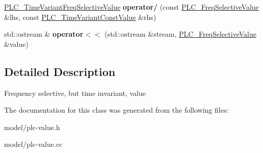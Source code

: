 \begin{DoxyCompactItemize}
\item 
\hypertarget{classns3_1_1PLC__FreqSelectiveValue_ac83aa895ecbeab5a39607bac5dfdd80a}{\hyperlink{classns3_1_1PLC__TimeVariantFreqSelectiveValue}{\-P\-L\-C\-\_\-\-Time\-Variant\-Freq\-Selective\-Value} {\bfseries operator/} (const \hyperlink{classns3_1_1PLC__FreqSelectiveValue}{\-P\-L\-C\-\_\-\-Freq\-Selective\-Value} \&lhs, const \hyperlink{classns3_1_1PLC__TimeVariantConstValue}{\-P\-L\-C\-\_\-\-Time\-Variant\-Const\-Value} \&rhs)}\label{classns3_1_1PLC__FreqSelectiveValue_ac83aa895ecbeab5a39607bac5dfdd80a}

\item 
\hypertarget{classns3_1_1PLC__FreqSelectiveValue_a64b2ca968a1db457f4c26f757c069d1d}{std\-::ostream \& {\bfseries operator$<$$<$} (std\-::ostream \&stream, \hyperlink{classns3_1_1PLC__FreqSelectiveValue}{\-P\-L\-C\-\_\-\-Freq\-Selective\-Value} \&value)}\label{classns3_1_1PLC__FreqSelectiveValue_a64b2ca968a1db457f4c26f757c069d1d}

\end{DoxyCompactItemize}


\subsection{\-Detailed \-Description}
\-Frequency selective, but time invariant, value 

\-The documentation for this class was generated from the following files\-:\begin{DoxyCompactItemize}
\item 
model/plc-\/value.\-h\item 
model/plc-\/value.\-cc\end{DoxyCompactItemize}
